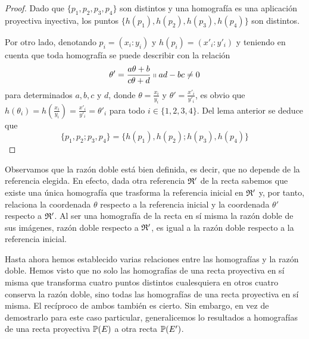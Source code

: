 \begin{proof}
	Dado que $\{p_1,p_2,p_3,p_4\}$ son distintos y una homografía es una aplicación proyectiva inyectiva, los puntos $\{h(p_1),h(p_2),h(p_3),h(p_4)\}$ son distintos.
	
	Por otro lado, denotando $p_i=(x_i:y_i)$ y $h(p_i)=(x'_i:y'_i)$ y teniendo en cuenta que toda homografía se puede describir con la relación
	\begin{equation*}
		\theta'=\frac{a\theta+b}{c\theta +d}\shortparallel ad-bc\not=0
	\end{equation*}
	para determinados $a,b,c$ y $d$, donde $\theta=\frac{x_i}{y_i}$ y $\theta'=\frac{x'_i}{y'_i}$, es obvio que $h(\theta_i)=h(\frac{x_i}{y_i})=\frac{x'_i}{y'_i}=\theta'_i$ para todo $i\in\{1,2,3,4\}$. Del lema anterior se deduce que
	\begin{equation*}
		\{p_1,p_2;p_3,p_4\}=\{h(p_1),h(p_2);h(p_3),h(p_4)\}
	\end{equation*}
\end{proof}
\begin{obs}
	Observamos que la razón doble está bien definida, es decir, que no depende de la referencia elegida. En efecto, dada otra referencia $\mathfrak{R}'$ de la recta sabemos que existe una única homografía que trasforma la referencia inicial en $\mathfrak{R}'$ y, por tanto, relaciona la coordenada $\theta$ respecto a la referencia inicial y la coordenada $\theta'$ respecto a $\mathfrak{R}'$. Al ser una homografía de la recta en sí misma la razón doble de sus imágenes, razón doble respecto a $\mathfrak{R}'$, es igual a la razón doble respecto a la referencia inicial.
\end{obs}
Hasta ahora hemos establecido varias relaciones entre las homografías y la razón doble. Hemos visto que no solo las homografías de una recta proyectiva en sí misma que transforma cuatro puntos distintos cualesquiera en otros cuatro conserva la razón doble, sino todas las homografías de una recta proyectiva en sí misma. El recíproco de ambos también es cierto. Sin embargo, en vez de demostrarlo para este caso particular, generalicemos lo resultados a homografías de una recta proyectiva $\mathbb{P}(E)$ a otra recta $\mathbb{P}(E')$.

